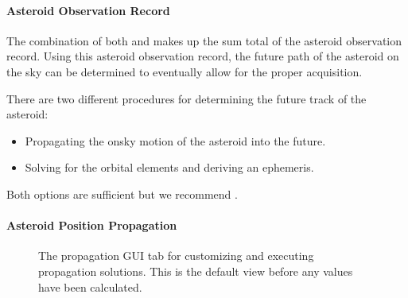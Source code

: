 \documentclass[letterpaper,11pt,english]{sphinxmanual}
\begin{document}
\paragraph{Asteroid Observation Record}
\label{\detokenize{user/manual_mode:asteroid-observation-record}}\label{\detokenize{user/manual_mode:user-manual-mode-procedure-asteroid-observation-record}}
\sphinxAtStartPar
The combination of both {\hyperref[\detokenize{user/manual_mode:user-manual-mode-procedure-historical-observations}]{}}
and {\hyperref[\detokenize{user/manual_mode:user-manual-mode-procedure-asteroid-on-sky-position}]{}} makes up the
sum total of the asteroid observation record. Using this asteroid observation
record, the future path of the asteroid on the sky can be determined to
eventually allow for the proper acquisition.

\sphinxAtStartPar
There are two different procedures for determining the future track of the
asteroid:
\begin{itemize}
\item {} 
\sphinxAtStartPar
Propagating the on\sphinxhyphen{}sky motion of the asteroid into the future.

\item {} 
\sphinxAtStartPar
Solving for the orbital elements and deriving an ephemeris.

\end{itemize}

\sphinxAtStartPar
Both options are sufficient but we recommend
{\hyperref[\detokenize{user/manual_mode:user-manual-mode-procedure-asteroid-position-propagation}]{}}.


\paragraph{Asteroid Position Propagation}
\label{\detokenize{user/manual_mode:asteroid-position-propagation}}\label{\detokenize{user/manual_mode:user-manual-mode-procedure-asteroid-position-propagation}}
\begin{figure}[H]
\centering
\capstart

\noindent{}
\caption{The propagation GUI tab for customizing and executing propagation solutions.
This is the default view before any values have been calculated.}\label{\detokenize{user/manual_mode:id7}}\label{\detokenize{user/manual_mode:figure-manual-mode-gui-propagate}}\end{figure}
\end{document}
